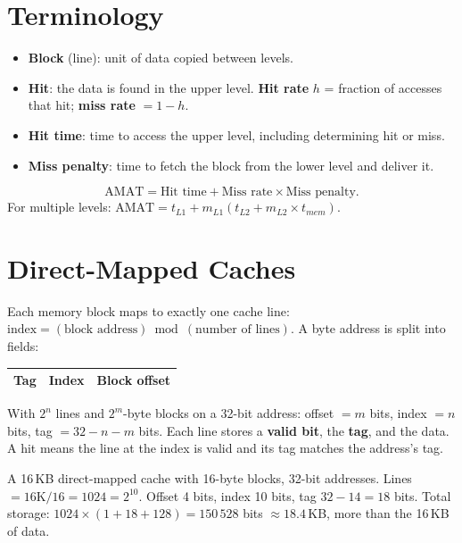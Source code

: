 \section{Terminology}

\begin{itemize}
  \item \textbf{Block} (line): unit of data copied between levels.
  \item \textbf{Hit}: the data is found in the upper level. \textbf{Hit
    rate} $h$ = fraction of accesses that hit; \textbf{miss rate} $= 1 - h$.
  \item \textbf{Hit time}: time to access the upper level, including
    determining hit or miss.
  \item \textbf{Miss penalty}: time to fetch the block from the lower level
    and deliver it.
\end{itemize}

\begin{important}
\[
\text{AMAT} = \text{Hit time} + \text{Miss rate} \times \text{Miss penalty}.
\]
For multiple levels:
$\text{AMAT} = t_{L1} + m_{L1}(t_{L2} + m_{L2} \times t_{mem})$.
\end{important}

\section{Direct-Mapped Caches}

Each memory block maps to exactly one cache line:
$\text{index} = (\text{block address}) \bmod (\text{number of lines})$.
A byte address is split into fields:
\begin{center}
\begin{tabular}{|c|c|c|}
\hline
Tag & Index & Block offset \\
\hline
\end{tabular}
\end{center}
With $2^n$ lines and $2^m$-byte blocks on a 32-bit address: offset $= m$
bits, index $= n$ bits, tag $= 32 - n - m$ bits. Each line stores a
\textbf{valid bit}, the \textbf{tag}, and the data. A hit means the line at
the index is valid and its tag matches the address's tag.

\begin{example}
A 16\,KB direct-mapped cache with 16-byte blocks, 32-bit addresses.
Lines $= 16\text{K}/16 = 1024 = 2^{10}$. Offset 4 bits, index 10 bits,
tag $32 - 14 = 18$ bits. Total storage: $1024 \times (1 + 18 + 128) =
150\,528$ bits $\approx 18.4$\,KB, more than the 16\,KB of data.
\end{example}

